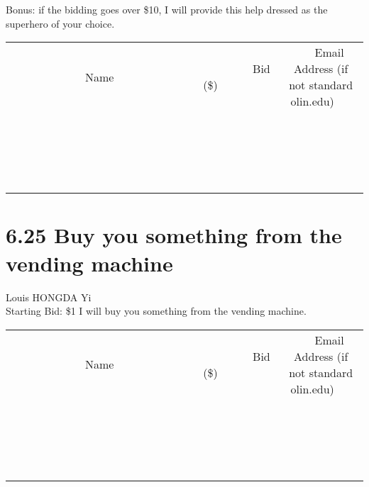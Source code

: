 \documentclass[11pt]{article}
\begin{document}
Bonus: if the bidding goes over \$10, I will provide this help dressed as the superhero of your choice.
\\[3ex]
\begin{tabular}{c c c}
~~~~~~~~~~~~~Name~~~~~~~~~~~~~ & ~~~~~~~~~Bid (\$)~~~~~~~~~  & ~~~Email Address (if not standard olin.edu)~~~\\
 & & \\
\hline
 & & \\
\hline
 & & \\
\hline
 & & \\
\hline
 & & \\
\hline
 & & \\
\hline
 & & \\
\hline
 & & \\
\hline
 & & \\
\hline
 & & \\
\hline
 & & \\
\hline
 & & \\
\hline
 & & \\
\hline
 & & \\
\hline
 & & \\
\hline
 & & \\
\hline
 & & \\
\hline
 & & \\
\hline
 & & \\
\hline
\end{tabular}
\newpage
\section*{6.25 Buy you something from the vending machine}
Louis HONGDA Yi
\\
Starting Bid: \$1
\newline
I will buy you something from the vending machine.
\\[3ex]
\begin{tabular}{c c c}
~~~~~~~~~~~~~Name~~~~~~~~~~~~~ & ~~~~~~~~~Bid (\$)~~~~~~~~~  & ~~~Email Address (if not standard olin.edu)~~~\\
 & & \\
\hline
 & & \\
\hline
 & & \\
\hline
 & & \\
\hline
 & & \\
\hline
 & & \\
\hline
 & & \\
\hline
 & & \\
\hline
 & & \\
\hline
 & & \\
\hline
 & & \\
\hline
 & & \\
\hline
 & & \\
\hline
 & & \\
\hline
 & & \\
\hline
 & & \\
\hline
 & & \\
\hline
 & & \\
\hline
 & & \\
\hline
\end{tabular}
\newpage
\end{document}
